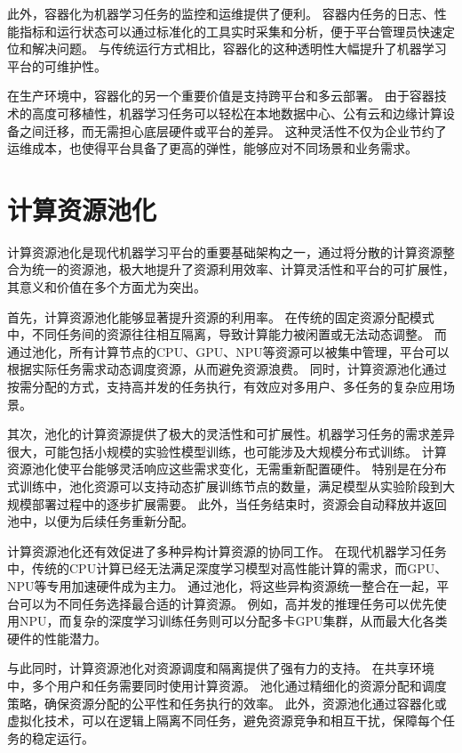 此外，容器化为机器学习任务的监控和运维提供了便利。
容器内任务的日志、性能指标和运行状态可以通过标准化的工具实时采集和分析，便于平台管理员快速定位和解决问题。
与传统运行方式相比，容器化的这种透明性大幅提升了机器学习平台的可维护性。

在生产环境中，容器化的另一个重要价值是支持跨平台和多云部署。
由于容器技术的高度可移植性，机器学习任务可以轻松在本地数据中心、公有云和边缘计算设备之间迁移，而无需担心底层硬件或平台的差异。
这种灵活性不仅为企业节约了运维成本，也使得平台具备了更高的弹性，能够应对不同场景和业务需求。


\section{计算资源池化}

计算资源池化是现代机器学习平台的重要基础架构之一，通过将分散的计算资源整合为统一的资源池，极大地提升了资源利用效率、计算灵活性和平台的可扩展性，其意义和价值在多个方面尤为突出。

首先，计算资源池化能够显著提升资源的利用率。
在传统的固定资源分配模式中，不同任务间的资源往往相互隔离，导致计算能力被闲置或无法动态调整。
而通过池化，所有计算节点的CPU、GPU、NPU等资源可以被集中管理，平台可以根据实际任务需求动态调度资源，从而避免资源浪费。
同时，计算资源池化通过按需分配的方式，支持高并发的任务执行，有效应对多用户、多任务的复杂应用场景。

其次，池化的计算资源提供了极大的灵活性和可扩展性。机器学习任务的需求差异很大，可能包括小规模的实验性模型训练，也可能涉及大规模分布式训练。
计算资源池化使平台能够灵活响应这些需求变化，无需重新配置硬件。
特别是在分布式训练中，池化资源可以支持动态扩展训练节点的数量，满足模型从实验阶段到大规模部署过程中的逐步扩展需要。
此外，当任务结束时，资源会自动释放并返回池中，以便为后续任务重新分配。

计算资源池化还有效促进了多种异构计算资源的协同工作。
在现代机器学习任务中，传统的CPU计算已经无法满足深度学习模型对高性能计算的需求，而GPU、NPU等专用加速硬件成为主力。
通过池化，将这些异构资源统一整合在一起，平台可以为不同任务选择最合适的计算资源。
例如，高并发的推理任务可以优先使用NPU，而复杂的深度学习训练任务则可以分配多卡GPU集群，从而最大化各类硬件的性能潜力。

与此同时，计算资源池化对资源调度和隔离提供了强有力的支持。
在共享环境中，多个用户和任务需要同时使用计算资源。
池化通过精细化的资源分配和调度策略，确保资源分配的公平性和任务执行的效率。
此外，资源池化通过容器化或虚拟化技术，可以在逻辑上隔离不同任务，避免资源竞争和相互干扰，保障每个任务的稳定运行。

